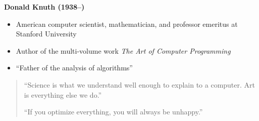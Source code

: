{
\begin{frame}[plain,t]
\vfill
\hfill
\begin{minipage}{.42\textwidth}
\hspace{1em}\textbf{\large Donald Knuth (1938--)}
\begin{itemize}
\item American computer scientist, mathematician, and professor emeritus at Stanford University
\item Author of the multi-volume work \emph{The Art of Computer Programming}
\item ``Father of the analysis of algorithms''
\end{itemize}
\end{minipage}

\bigskip

\begin{quote}
``Science is what we understand well enough to explain to a computer. Art is everything else we do.''

\medskip

``If you optimize everything, you will always be unhappy.''
\end{quote}
\vspace*{-4\baselineskip}\null
\end{frame}}


